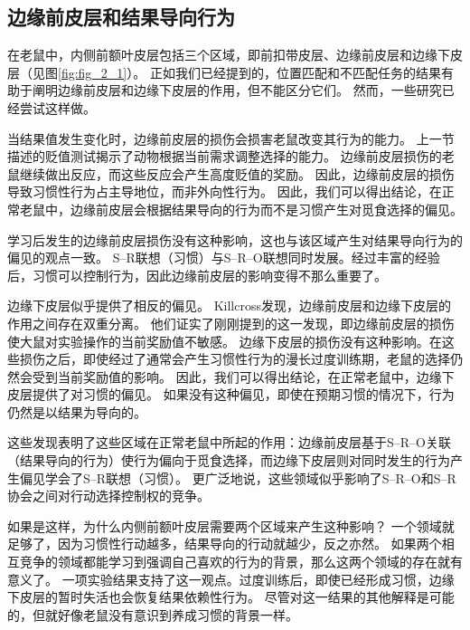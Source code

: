 \subsection{边缘前皮层和结果导向行为}

在老鼠中，内侧前额叶皮层包括三个区域，即前扣带皮层、边缘前皮层和边缘下皮层（见图\ref{fig:fig_2_1}）。
正如我们已经提到的，位置匹配和不匹配任务的结果有助于阐明边缘前皮层和边缘下皮层的作用，但不能区分它们。
然而，一些研究已经尝试这样做。\par


当结果值发生变化时，边缘前皮层的损伤会损害老鼠改变其行为的能力。
上一节描述的贬值测试揭示了动物根据当前需求调整选择的能力。
边缘前皮层损伤的老鼠继续做出反应，而这些反应会产生高度贬值的奖励。
因此，边缘前皮层的损伤导致习惯性行为占主导地位，而非外向性行为\cite{balleine1998goal,corbit2003role}。
因此，我们可以得出结论，在正常老鼠中，边缘前皮层会根据结果导向的行为而不是习惯产生对觅食选择的偏见。\par


学习后发生的边缘前皮层损伤没有这种影响\cite{ostlund2005lesions}，这也与该区域产生对结果导向行为的偏见的观点一致。
S–R联想（习惯）与S–R–O联想同时发展。经过丰富的经验后，习惯可以控制行为，因此边缘前皮层的影响变得不那么重要了。\par


边缘下皮层似乎提供了相反的偏见。
Killcross\cite{killcross2003coordination}发现，边缘前皮层和边缘下皮层的作用之间存在双重分离。
他们证实了刚刚提到的这一发现，即边缘前皮层的损伤使大鼠对实验操作的当前奖励值不敏感。
边缘下皮层的损伤没有这种影响。在这些损伤之后，即使经过了通常会产生习惯性行为的漫长过度训练期，老鼠的选择仍然会受到当前奖励值的影响。
因此，我们可以得出结论，在正常老鼠中，边缘下皮层提供了对习惯的偏见。
如果没有这种偏见，即使在预期习惯的情况下，行为仍然是以结果为导向的。\par


这些发现表明了这些区域在正常老鼠中所起的作用：边缘前皮层基于S–R–O关联（结果导向的行为）使行为偏向于觅食选择，而边缘下皮层则对同时发生的行为产生偏见学会了S–R联想（习惯）。
更广泛地说，这些领域似乎影响了S–R–O和S–R协会之间对行动选择控制权的竞争。\par


如果是这样，为什么内侧前额叶皮层需要两个区域来产生这种影响？
一个领域就足够了，因为习惯性行动越多，结果导向的行动就越少，反之亦然。
如果两个相互竞争的领域都能学习到强调自己喜欢的行为的背景，那么这两个领域的存在就有意义了。
一项实验结果支持了这一观点。过度训练后，即使已经形成习惯，边缘下皮层的暂时失活也会恢复结果依赖性行为\cite{coutureau2003inactivation}。
尽管对这一结果的其他解释是可能的，但就好像老鼠没有意识到养成习惯的背景一样。\par



